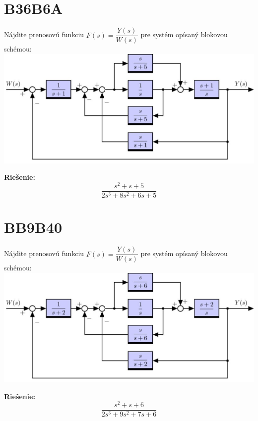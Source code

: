 \documentclass[a4paper, 12pt]{article}
\newenvironment{task}{}{}
\newenvironment{solution}{\noindent\textbf{Riešenie:}}{}
\begin{document}
\section*{B36B6A}
\begin{task}
    Nájdite prenosovú funkciu $F(s)=\dfrac{Y(s)}{W(s)}$ pre systém opísaný blokovou schémou: \\

    \includegraphics{images/blokovka02_00002.jpg}
\end{task}

\begin{solution}
    \begin{equation*}
        \dfrac{s^2+s+5}{2s^3+8s^2+6s+5}
    \end{equation*}
\end{solution}

\section*{BB9B40}
\begin{task}
    Nájdite prenosovú funkciu $F(s)=\dfrac{Y(s)}{W(s)}$ pre systém opísaný blokovou schémou: \\

    \includegraphics{images/blokovka02_00003.jpg}
\end{task}

\begin{solution}
    \begin{equation*}
        \dfrac{s^2+s+6}{2s^3+9s^2+7s+6}
    \end{equation*}
\end{solution}
\end{document}
